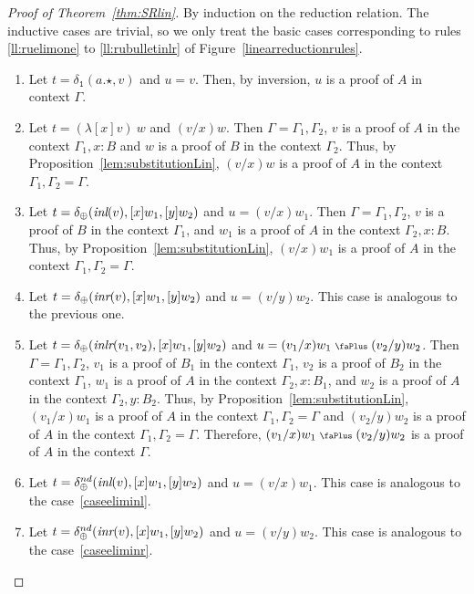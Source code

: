 \documentclass[screen, sigconf,authorversion,nonacm]{acmart}
\theoremstyle{acmdefinition}
\numberwithin{equation}{section}
\newcommand\abstr[1]{[#1]}
\newcommand\inl{\mbox{\it inl}}
\newcommand\inr{\mbox{\it inr}}
\newcommand\inlr{\mbox{\it inlr}}
\newcommand\plus{\mathrel{\text{\normalfont\scalebox{0.7}{\faPlus}}}}
\newcommand\one{\ensuremath{\mathtt 1}}
\newcommand\elimone{\delta_{\one}}
\newcommand\elimplus{\delta_{\oplus}}
\begin{document}
\begin{proof}[Proof of Theorem~\ref{thm:SRlin}]
  By induction on the reduction relation. The inductive cases are trivial, so we
  only treat the basic cases corresponding to rules \eqref{ll:ruelimone} to
  \eqref{ll:rubulletinlr} of Figure~\ref{linearreductionrules}.
  \begin{enumerate}
    \item Let $t=\elimone(a.\star,v)$ and $u=v$. Then, by inversion, $u$ is a
    proof of $A$ in context $\Gamma$.

    \item Let $t=(\lambda \abstr{x}v)~w$ and $(v/x)w$. Then
    $\Gamma=\Gamma_1,\Gamma_2$, $v$ is a proof of $A$ in the context
    $\Gamma_1,x:B$ and $w$ is a proof of $B$ in the context $\Gamma_2$. Thus, by
    Proposition~\ref{lem:substitutionLin}, $(v/x)w$ is a proof of $A$ in the
    context $\Gamma_1,\Gamma_2=\Gamma$.

		\item\label{caseeliminl} Let $t=\elimplus(\inl(v),\abstr{x}w_1,\abstr{y}w_2)$ and $u=(v/x)w_1$.
		Then $\Gamma=\Gamma_1,\Gamma_2$, $v$ is a proof of $B$ in the context
		$\Gamma_1$, and $w_1$ is a proof of $A$ in the context $\Gamma_2,x:B$. Thus,
		by Proposition~\ref{lem:substitutionLin}, $(v/x)w_1$ is a proof of $A$ in
		the context $\Gamma_1,\Gamma_2=\Gamma$.

		\item\label{caseeliminr} Let $t=\elimplus(\inr(v),\abstr{x}w_1,\abstr{y}w_2)$ and $u=(v/y)w_2$.
		This case is analogous to the previous one.

		\item Let $t=\elimplus(\inlr(v_1,v_2),\abstr{x}w_1,\abstr{y}w_2)$ and $u=(v_1/x)w_1 \plus (v_2/y)w_2$.
     Then $\Gamma=\Gamma_1,\Gamma_2$, $v_1$ is a proof of $B_1$ in the context $\Gamma_1$, $v_2$ is a proof of $B_2$ in the context $\Gamma_1$, $w_1$ is a proof of $A$ in the context $\Gamma_2,x:B_1$, and $w_2$ is a proof of $A$ in the context $\Gamma_2,y:B_2$. Thus, by Proposition~\ref{lem:substitutionLin}, $(v_1/x)w_1$ is a proof of $A$ in the context $\Gamma_1,\Gamma_2=\Gamma$ and $(v_2/y)w_2$ is a proof of $A$ in the context $\Gamma_1,\Gamma_2=\Gamma$. Therefore, $(v_1/x)w_1 \plus (v_2/y)w_2$ is a proof of $A$ in the context $\Gamma$.

		\item Let $t=\elimplus^{nd}(\inl(v),\abstr{x}w_1,\abstr{y}w_2)$ and $u=(v/x)w_1$. This case is analogous to the case~\ref{caseeliminl}.

		\item Let $t=\elimplus^{nd}(\inr(v),\abstr{x}w_1,\abstr{y}w_2)$ and $u=(v/y)w_2$. This case is analogous to the case~\ref{caseeliminr}.


\end{enumerate}
\end{proof}
\end{document}
